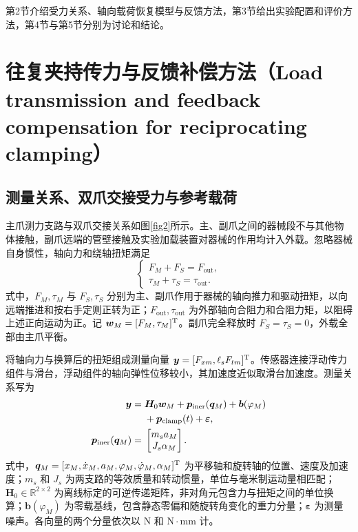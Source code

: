 \documentclass{JQR_LaTeX_Template-0507/JQRnew}
\providecommand{\RevisionColor}{\color{black}}
\newcommand{\revbegin}{\begingroup\RevisionColor}
\newcommand{\revend}{\par\endgroup}
\begin{document}
\revbegin
第2节介绍受力关系、轴向载荷恢复模型与反馈方法，第3节给出实验配置和评价方法，第4节与第5节分别为讨论和结论。
\revend

\section{往复夹持传力与反馈补偿方法（Load transmission and feedback compensation for reciprocating clamping）}

\subsection{测量关系、双爪交接受力与参考载荷}

主爪测力支路与双爪交接关系如图\ref{fig2}所示。主、副爪之间的器械段不与其他物体接触，副爪远端的管壁接触及实验加载装置对器械的作用均计入外载。忽略器械自身惯性，轴向力和绕轴扭矩满足
\begin{equation}
\label{eq:balance}
\begin{cases}
F_M+F_S=F_{\mathrm{out}},\\
\tau_M+\tau_S=\tau_{\mathrm{out}}.
\end{cases}
\end{equation}
式中，$F_M,\tau_M$ 与 $F_S,\tau_S$ 分别为主、副爪作用于器械的轴向推力和驱动扭矩，以向远端推进和按右手定则正转为正；$F_{\mathrm{out}},\tau_{\mathrm{out}}$ 为外部轴向合阻力和合阻力矩，以阻碍上述正向运动为正。记 $\bm w_M=[F_M,\tau_M]^{\rm T}$。副爪完全释放时 $F_S=\tau_S=0$，外载全部由主爪平衡。

将轴向力与换算后的扭矩组成测量向量 $\bm y=[F_{xm},\ell_sF_{tm}]^{\rm T}$。传感器连接浮动传力组件与滑台，浮动组件的轴向弹性位移较小，其加速度近似取滑台加速度。测量关系写为
\begin{align}
\label{eq:measurement}
\bm y={}&\bm H_0\bm w_M+\bm p_{\mathrm{iner}}(\bm q_M)
+\bm b(\varphi_M)\notag\\
&+\bm p_{\mathrm{clamp}}(t)+\bm\varepsilon,\\
\label{eq:inertia}
\bm p_{\mathrm{iner}}(\bm q_M)={}&
\begin{bmatrix}m_sa_M\\J_s\alpha_M\end{bmatrix}.
\end{align}
式中，$\bm q_M=[x_M,\dot x_M,a_M,\varphi_M,\dot\varphi_M,\alpha_M]^{\rm T}$ 为平移轴和旋转轴的位置、速度及加速度；$m_s$ 和 $J_s$ 为两支路的等效质量和转动惯量，单位与毫米制运动量相匹配；$\bm H_0\in\mathbb R^{2\times2}$ 为离线标定的可逆传递矩阵，非对角元包含力与扭矩之间的单位换算；$\bm b(\varphi_M)$ 为零载基线，包含静态零偏和随旋转角变化的重力分量；$\bm\varepsilon$ 为测量噪声。各向量的两个分量依次以 $\mathrm{N}$ 和 $\mathrm{N}\cdot\mathrm{mm}$ 计。
\end{document}
